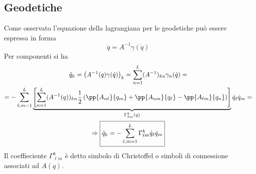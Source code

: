 \documentclass[Main.tex]{subfiles}
\begin{document}
\subsection{Geodetiche}
Come osservato l'equazione della lagrangiana per le geodetiche può essere espressa in forma
\begin{equation}
	\ddot q=A^{-1} \gamma (\dot q)
\end{equation}
Per componenti si ha
\begin{gather}
	\ddot q_k = \left( A^{-1} (q) \gamma ( \dot q)\right)_k = \sum_{n=1}^L (A^{-1})_{kn} \gamma_n (\dot q) = \\
	= - \sum_{\ell ,m =1}^L 	\underbrace{\left[ \sum_{n=1}^L (A^{-1}(q))_{kn} \frac{1}{2}  \left( \pp{A_{n \ell}}{q_m} + \pp{A_{n m}}{q_\ell} - \pp{A_{\ell m}}{q_n} \right)\right]}_{\Gamma_{\ell m}^k (q)} \dot q_\ell \dot q_m=\\
	\Rightarrow \boxed{ \ddot q_k = -\sum_{\ell, m=1}^L \Gamma_{\ell m}^k \dot q_\ell \dot q_m }
\end{gather}
Il coeffieciente $\Gamma ^k_{\ell m}$ è detto simbolo di Christoffel o simboli di connessione associati ad $A(q)$.
\end{document}
